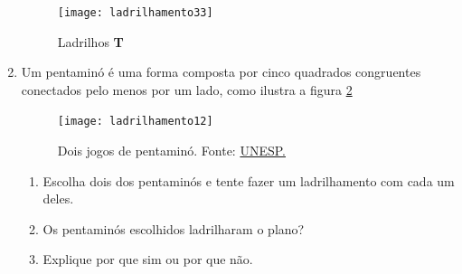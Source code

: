 \begin{enumerate}
	\begin{figure}[H]
	\centering
	\texttt{[image: ladrilhamento33]}
	\label{ladt}
	\caption{Ladrilhos \textbf{T}}
	\end{figure}

\item  Um pentaminó é uma forma composta por cinco quadrados congruentes conectados pelo menos por um lado, como ilustra a figura \ref{pentamino}

	\begin{figure}[H]
	\centering
	\texttt{[image: ladrilhamento12]}
	\label{pentamino}

	\caption{Dois jogos de pentaminó. Fonte: \href{https://www.ibilce.unesp.br/departamentos/matematica/eventos/3-cejta/regra-dos-jogos/9-ano---pentamino/}{UNESP.}}
	\end{figure}
	
	\begin{enumerate}
		\item Escolha dois dos pentaminós e tente fazer um ladrilhamento com cada um deles.
		\item Os pentaminós escolhidos ladrilharam o plano?
		\item Explique por que sim ou por que não.
	\end{enumerate}


	
	
\end{enumerate}





